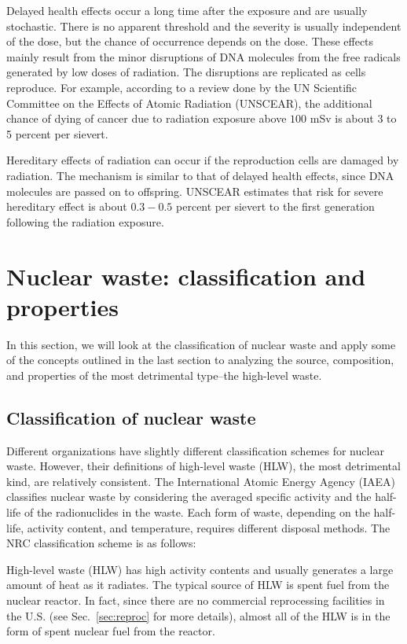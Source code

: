 \documentclass[nofootinbib,preprint,aps]{revtex4-1}
\begin{document}
        Delayed health effects occur a long time after the exposure and are usually stochastic. There is
        no apparent threshold and the severity is usually independent of the dose, but
        the chance of occurrence depends on the dose.\cite{u16}
        These effects mainly result from the minor disruptions of DNA molecules from the free radicals generated
        by low doses of radiation. The disruptions are replicated
        as cells reproduce.
        For example, according to a review done by the UN Scientific Committee on the Effects of Atomic Radiation
        (UNSCEAR), the additional chance of dying of cancer due to radiation exposure above $100$ mSv is
        about 3 to 5 percent per sievert.\cite{unscear16}

        Hereditary effects of radiation can occur if the reproduction cells are damaged by radiation.
        The mechanism is similar to that of delayed health effects, since DNA molecules are passed on
        to offspring.
        UNSCEAR estimates that risk for severe hereditary effect is about $0.3-0.5$ percent per sievert to
        the first generation following the radiation exposure.\cite{u16, unscear16}
\section{Nuclear waste: classification and properties}
\label{sec:waste}
    In this section, we will look at the classification of nuclear waste and
    apply some of the concepts outlined in the last section to 
    analyzing the source, composition, and properties of the most detrimental type--the high-level waste.
    \subsection{Classification of nuclear waste}
    \label{sec:waste:classification}
    Different organizations have slightly different classification schemes for nuclear waste.
    However, their definitions of high-level waste (HLW), the most detrimental kind, are relatively consistent.
    The International Atomic Energy Agency (IAEA) classifies nuclear waste by considering the averaged specific activity
    and the half-life of the radionuclides in the waste.\cite{iaea09}
    Each form of waste, depending on the half-life, activity content, and temperature, requires different
    disposal methods. The NRC classification scheme is as follows:\cite{nrc09}

    High-level waste (HLW) has high activity contents and usually generates a large amount of
    heat as it radiates. The typical source of HLW is spent fuel from the nuclear reactor.
    In fact, since there are no commercial reprocessing facilities in the U.S. (see Sec.~\ref{sec:reproc} for
    more details),
    almost all of the HLW is in the form of spent nuclear fuel from the reactor.
\end{document}
